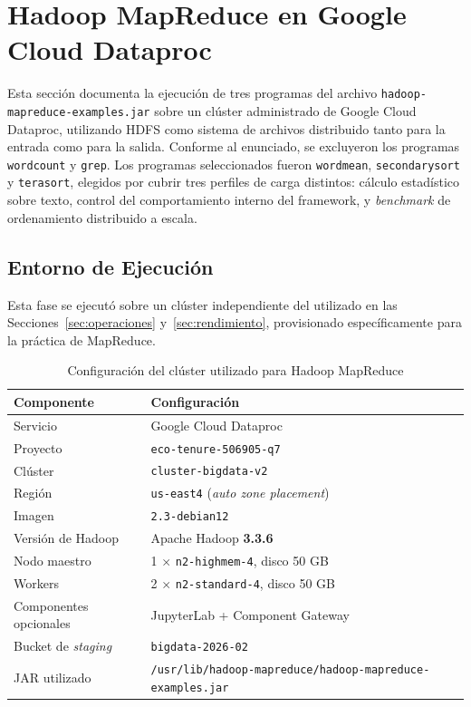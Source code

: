\section{Hadoop MapReduce en Google Cloud Dataproc}
\label{sec:hadoop}

Esta sección documenta la ejecución de tres programas del archivo \texttt{hadoop-\bk{}mapreduce-\bk{}examples.\bk{}jar} sobre un clúster administrado de Google Cloud Dataproc, utilizando HDFS como sistema de archivos distribuido tanto para la entrada como para la salida. Conforme al enunciado, se excluyeron los programas \texttt{wordcount} y \texttt{grep}. Los programas seleccionados fueron \texttt{wordmean}, \texttt{secondarysort} y \texttt{terasort}, elegidos por cubrir tres perfiles de carga distintos: cálculo estadístico sobre texto, control del comportamiento interno del framework, y \textit{benchmark} de ordenamiento distribuido a escala.

\subsection{Entorno de Ejecución}

Esta fase se ejecutó sobre un clúster independiente del utilizado en las Secciones~\ref{sec:operaciones} y~\ref{sec:rendimiento}, provisionado específicamente para la práctica de MapReduce.

\begin{table}[H]
\centering
\caption{Configuración del clúster utilizado para Hadoop MapReduce}
\label{tab:hadoop-cluster}
\vspace{0.2cm}
\small
\begin{tabular}{@{}ll@{}}
\toprule
\textbf{Componente} & \textbf{Configuración} \\
\midrule
Servicio                & Google Cloud Dataproc \\
Proyecto                & \texttt{eco-\bk{}tenure-\bk{}506905-\bk{}q7} \\
Clúster                 & \texttt{cluster-bigdata-v2} \\
Región                  & \texttt{us-east4} (\textit{auto zone placement}) \\
Imagen                  & \texttt{2.3-debian12} \\
Versión de Hadoop       & Apache Hadoop \textbf{3.3.6} \\
Nodo maestro            & 1 $\times$ \texttt{n2-highmem-4}, disco 50 GB \\
Workers                 & 2 $\times$ \texttt{n2-standard-4}, disco 50 GB \\
Componentes opcionales  & JupyterLab + Component Gateway \\
Bucket de \textit{staging} & \texttt{bigdata-2026-02} \\
JAR utilizado           & \texttt{/\bk{}usr/\bk{}lib/\bk{}hadoop-\bk{}mapreduce/\bk{}hadoop-\bk{}mapreduce-\bk{}examples.\bk{}jar} \\
\bottomrule
\end{tabular}
\end{table}

